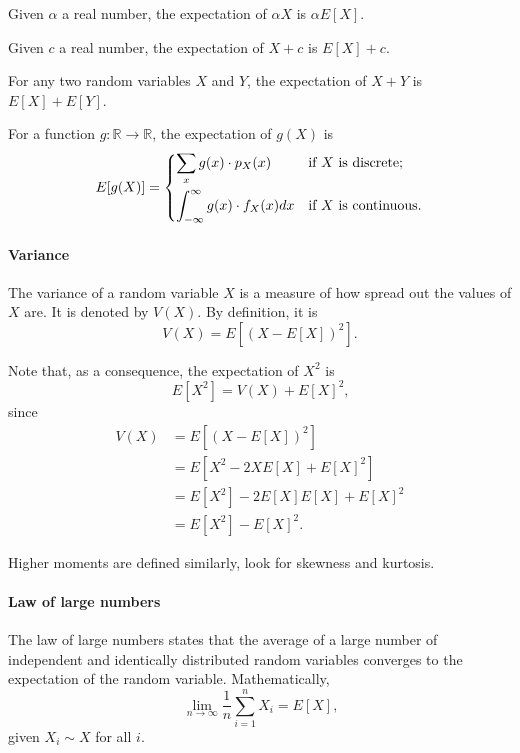 Given $\alpha$ a real number, the expectation of $\alpha X$ is $\alpha E[X]$.

Given $c$ a real number, the expectation of $X + c$ is $E[X] + c$.

For any two random variables $X$ and $Y$, the expectation of $X + Y$ is $E[X] + E[Y]$.

For a function $g : \mathbb{R} \rightarrow \mathbb{R}$, the expectation of $g(X)$ is
\begin{equation}
  \label{eq:egx}
  E[g(X)] = \begin{dcases}
    \sum_{x} g(x) \cdot p_X(x) & \text{if $X$ is discrete; } \\
    \int_{-\infty}^{\infty} g(x) \cdot f_X(x) dx & \text{if $X$ is continuous.}
  \end{dcases}
\end{equation}

\paragraph{Variance}  The variance of a random variable $X$ is a measure of how
spread out the values of $X$ are.  It is denoted by $V(X)$.  By definition, it is
\begin{equation}
  \label{eq:variance}
  V(X) = E\!\left[\left(X - E[X]\right)^2\right]\text{.}
\end{equation}

Note that, as a consequence, the expectation of $X^2$ is
\[
  E[X^2] = V(X) + E[X]^2\text{,}
\]
since
\begin{align*}
  V(X)
    &= E\!\left[\left(X - E[X]\right)^2\right] \\
    &= E\!\left[X^2 - 2 X E[X] + E[X]^2\right] \\
    &= E[X^2] - 2 E[X] E[X] + E[X]^2 \\
    &= E[X^2] - E[X]^2\text{.}
\end{align*}

Higher moments are defined similarly, look for skewness and kurtosis.

\paragraph{Law of large numbers}  The law of large numbers states that the average of
a large number of independent and identically distributed random variables converges
to the expectation of the random variable.  Mathematically,
\begin{equation*}
  \lim_{n \rightarrow \infty} \frac{1}{n} \sum_{i = 1}^n X_i = E[X]\text{,}
\end{equation*}
given $X_i \sim X$ for all $i$.


